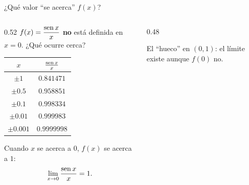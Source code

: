 \documentclass[10pt,aspectratio=169]{beamer}
\begin{document}
\begin{frame}{¿Qué valor ``se acerca'' $f(x)$?}
  \begin{columns}
    \begin{column}{0.52\textwidth}
      $f(x)=\dfrac{\operatorname{sen} x}{x}$ \textbf{no} está definida en $x=0$. ¿Qué ocurre cerca?
      \begin{center}
        \small
        \begin{tabular}{c|c}
          $x$ & $\frac{\operatorname{sen} x}{x}$\\ \hline
          $\pm1$ & $0.841471$\\
          $\pm0.5$ & $0.958851$\\
          $\pm0.1$ & $0.998334$\\
          $\pm0.01$ & $0.999983$\\
          $\pm0.001$ & $0.9999998$
        \end{tabular}
      \end{center}
      Cuando $x$ se acerca a $0$, $f(x)$ se acerca a $1$:
      \[ \lim_{x\to0}\frac{\operatorname{sen} x}{x}=1. \]
    \end{column}
    \begin{column}{0.48\textwidth}
      \centering

      \small El ``hueco'' en $(0,1)$: el límite existe aunque $f(0)$ no.
    \end{column}
  \end{columns}
\end{frame}
\end{document}
